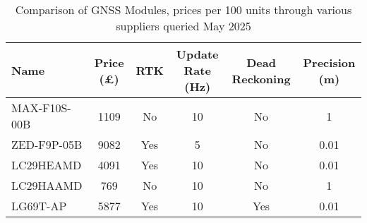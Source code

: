 \begin{table}[h]
  \centering
  \begin{tabular}{lccccc}
    \toprule
    \textbf{Name} & \textbf{Price (£)} & \textbf{RTK} & \textbf{Update Rate (Hz)} & \textbf{Dead Reckoning} & \textbf{Precision (m)} \\
    \midrule
    MAX-F10S-00B\cite{ublox_max_f10s} & 1109 & No  & 10 & No  & 1    \\
    ZED-F9P-05B\cite{ublox_zed_f9p}    & 9082 & Yes & 5  & No  & 0.01 \\
    LC29HEAMD\cite{quectel_product_brochure_v8_3}& 4091 & Yes & 10 & No  & 0.01 \\
    LC29HAAMD\cite{quectel_product_brochure_v8_3} & 769  & No  & 10 & No  & 1    \\
    LG69T-AP\cite{quectel_product_brochure_v8_3} & 5877 & Yes & 10 & Yes & 0.01 \\
    \bottomrule
  \end{tabular}
  \caption[Comparison of GNSS Modules]{Comparison of GNSS Modules, prices per 100 units through various suppliers queried May 2025}
  \label{tab:gnss-modules}
\end{table}